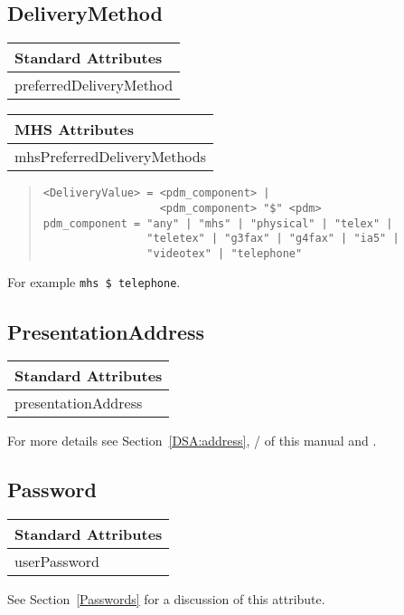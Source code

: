 \subsection{DeliveryMethod}
\begin{center}\small
\begin{tabular}{|l|}\hline
Standard Attributes \\ \hline
	preferredDeliveryMethod\\
\hline
\end{tabular}
\begin{tabular}{|l|}\hline
MHS Attributes \\ \hline
	mhsPreferredDeliveryMethods\\
\hline
\end{tabular}
\end{center}

\begin{quote}\begin{verbatim}
<DeliveryValue> = <pdm_component> | 
                  <pdm_component> "$" <pdm>
pdm_component = "any" | "mhs" | "physical" | "telex" | 
                "teletex" | "g3fax" | "g4fax" | "ia5" | 
                "videotex" | "telephone"
\end{verbatim}\end{quote}
For example \verb+mhs $ telephone+.

\subsection{PresentationAddress}
\begin{center}\small
\begin{tabular}{|l|}\hline
Standard Attributes \\ \hline
	presentationAddress\\
\hline
\end{tabular}
\end{center}
For more details see Section~\ref{DSA:address}, \volone/ of this manual and \cite{String.Addresses}.

\subsection{Password}
\begin{center}\small
\begin{tabular}{|l|}\hline
Standard Attributes \\ \hline
	userPassword\\
\hline
\end{tabular}
\end{center}
See Section~\ref{Passwords} for a discussion of this attribute.

